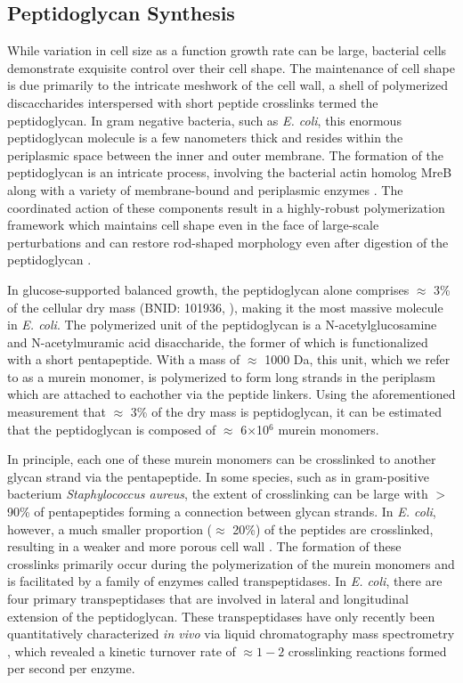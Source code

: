 \subsection{Peptidoglycan Synthesis}
While variation in cell size as a function growth rate can be large,
bacterial cells demonstrate exquisite control over their cell shape. The
maintenance of cell shape is due primarily to the intricate meshwork of the
cell wall, a shell of polymerized discaccharides interspersed with short
peptide crosslinks termed the peptidoglycan. In gram negative bacteria, such as \textit{E. coli}, this
enormous peptidoglycan molecule is a few nanometers thick and resides within the
periplasmic space between the inner and outer membrane. The formation of the
peptidoglycan is an intricate process, involving the bacterial actin homolog
MreB \citep{shi2018} along with a variety of membrane-bound and periplasmic
enzymes \citep{morgenstein2015}. The coordinated action of these components
result in a highly-robust polymerization framework which maintains cell shape
even in the face of large-scale perturbations and can restore rod-shaped
morphology even after digestion of the peptidoglycan \citep{harris2018,shi2018}.

In glucose-supported balanced growth, the peptidoglycan alone comprises
$\approx$ 3\% of the cellular dry mass (BNID: 101936, \cite{milo2010}), making it the most massive molecule in
\textit{E. coli}. The polymerized unit of the peptidoglycan is a
N-acetylglucosamine and N-acetylmuramic acid disaccharide, the former of which
is functionalized with a short pentapeptide. With a mass of $\approx$ 1000 Da,
this unit, which we refer to as a murein monomer, is polymerized to form long
strands in the periplasm which are attached to eachother via the peptide linkers. Using the
aforementioned measurement that $\approx$ 3\% of the dry mass is peptidoglycan,
it can be estimated that the peptidoglycan is composed of $\approx$
6$\times$10$^6$ murein monomers.

In principle, each one of these murein monomers can be crosslinked to another
glycan strand via the pentapeptide. In some species, such as in gram-positive
bacterium \textit{Staphylococcus aureus}, the extent of crosslinking can be
large with $>$ 90\% of pentapeptides forming a connection between glycan
strands. In \textit{E. coli}, however, a much smaller proportion ($\approx$
20\%) of the peptides are crosslinked, resulting in a weaker and more porous
cell wall \cite{vollmer2008a, rogers1980}. The formation of these crosslinks
primarily occur during the polymerization of the murein monomers and is
facilitated by a family of enzymes called transpeptidases. In \textit{E. coli},
there are four primary transpeptidases that are involved in lateral and
longitudinal extension of the peptidoglycan. These transpeptidases have only
recently been quantitatively characterized \textit{in vivo} via liquid
chromatography mass spectrometry \citep{catherwood2020}, which revealed a
kinetic turnover rate of $\approx 1 - 2$ crosslinking reactions formed per
second per enzyme.

